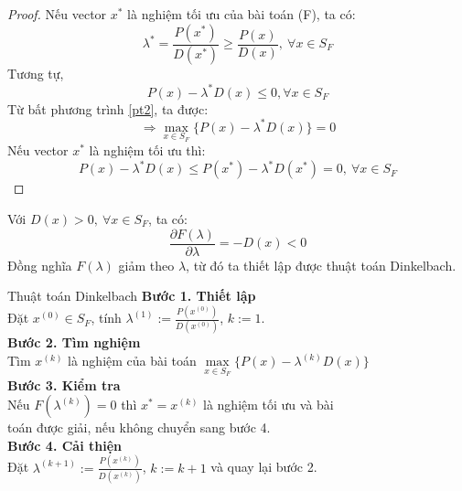 \documentclass{beamer}
\begin{document}
\begin{frame}
\begin{proof}
Nếu vector $x^*$ là nghiệm tối ưu của bài toán (F), ta có:
\begin{equation*}
\lambda^* = \frac{P(x^*)}{D(x^*)} \geq \frac{P(x)}{D(x)}, \: \forall x \in S_F
\end{equation*}
Tương tự,
\begin{equation} \label{pt2}
P(x)-\lambda^* D(x) \leq 0,  \forall x \in S_F
\end{equation}
Từ bất phương trình \eqref{pt2}, ta được:
\begin{equation*}
\Rightarrow \underset{x \in S_F}{\max}\{P(x)-\lambda^* D(x)\} = 0
\end{equation*}
Nếu vector $x^*$ là nghiệm tối ưu thì:
\begin{equation*}
P(x)-\lambda^*D(x) \leq P(x^*)-\lambda^* D(x^*) = 0, \: \forall x \in S_F
\end{equation*}
\end{proof}
\end{frame}

\begin{frame} \Large
Với $D(x)>0, \: \forall x \in S_F$, ta có:
\begin{equation}
\frac{\partial F(\lambda)}{\partial \lambda}= -D(x) < 0
\end{equation}
Đồng nghĩa $F(\lambda)$ giảm theo $\lambda$, từ đó ta thiết lập được thuật toán Dinkelbach.
\end{frame}

\begin{frame}{Thuật toán Dinkelbach}
\setlength{\parindent}{4em}
\noindent \textbf{Bước 1. Thiết lập} \\
Đặt $x^{(0)} \in S_F$, tính $\lambda^{(1)}:=\frac{P(x^{(0)})}{D(x^{(0)})}$, $k:=1$. \\
\noindent \textbf{Bước 2. Tìm nghiệm} \\
Tìm $x^{(k)}$ là nghiệm của bài toán $\underset{x \in S_F}{\max}\{P(x)-\lambda^{(k)} D(x)\}$ \\
\noindent \textbf{Bước 3. Kiểm tra} \\
Nếu $F(\lambda^{(k)})=0$ thì $x^*=x^{(k)}$ là nghiệm tối ưu và bài \\ toán được giải, nếu không chuyển sang bước 4. \\
\noindent \textbf{Bước 4. Cải thiện} \\
Đặt $\lambda^{(k+1)}:=\frac{P(x^{(k)})}{D(x^{(k)})}$, $k:=k+1$ và quay lại bước 2.
\end{frame}
\end{document}
